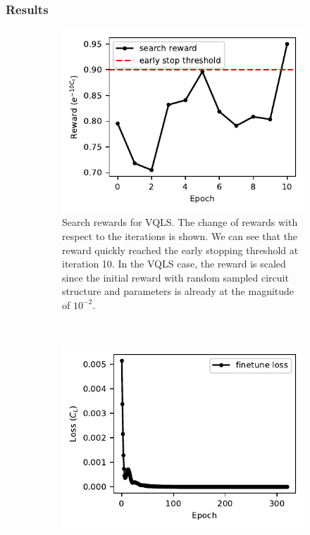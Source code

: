 \documentclass{ieeeaccess}
\begin{document}
\subsubsection{Results}
\begin{figure}[ht!]
    \centering
    \begin{subfigure}[t]{0.4\linewidth}
        \includegraphics[width=\linewidth]{peiyong_fig_6.pdf}
        \caption{Search rewards for VQLS. The change of rewards with respect to the iterations is shown. We can see that the reward quickly reached the early stopping threshold at iteration 10. In the VQLS case, the reward is scaled since the initial reward with random sampled circuit structure and parameters is already at the magnitude of $10^{-2}$.}
        \label{fig:vqls_4q_search}
    \end{subfigure}
    ~ %
    \begin{subfigure}[t]{0.4\linewidth}
        \includegraphics[width=\linewidth]{peiyong_fig_7.pdf}

\end{subfigure}
\end{figure}
\end{document}
